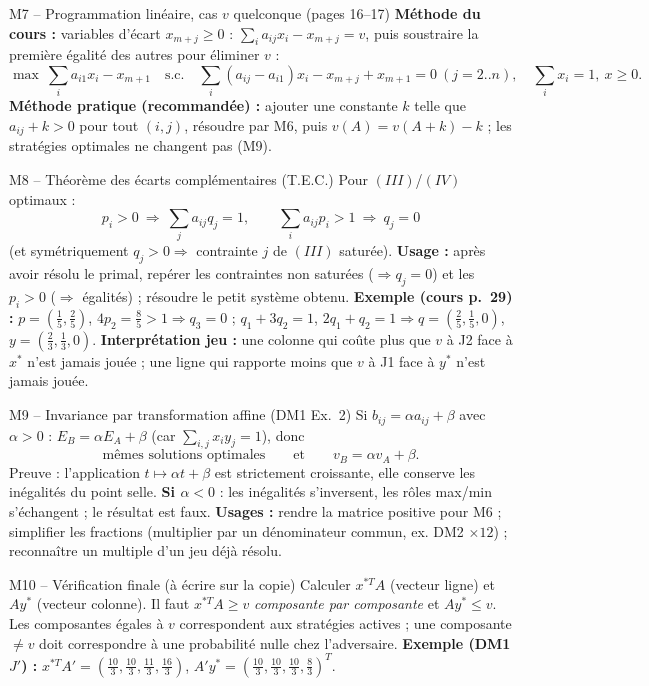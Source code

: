 \documentclass[11pt,a4paper]{article}
\begin{document}
\begin{methbox}{M7 -- Programmation linéaire, cas $v$ quelconque (pages 16--17)}
\textbf{Méthode du cours :} variables d'écart $x_{m+j}\ge0$ : $\sum_ia_{ij}x_i-x_{m+j}=v$, puis soustraire la première égalité des autres pour éliminer $v$ :
\[
\max\ \sum_i a_{i1}x_i-x_{m+1}\quad\text{s.c.}\quad \sum_i(a_{ij}-a_{i1})x_i-x_{m+j}+x_{m+1}=0\ (j=2..n),\quad \sum_ix_i=1,\ x\ge0.
\]
\textbf{Méthode pratique (recommandée) :} ajouter une constante $k$ telle que $a_{ij}+k>0$ pour tout $(i,j)$, résoudre par M6, puis $v(A)=v(A+k)-k$ ; les stratégies optimales ne changent pas (M9).
\end{methbox}

\begin{methbox}{M8 -- Théorème des écarts complémentaires (T.E.C.)}
Pour $(III)$/$(IV)$ optimaux :
\[
p_i>0\ \Rightarrow\ \sum_j a_{ij}q_j=1,\qquad \sum_i a_{ij}p_i>1\ \Rightarrow\ q_j=0
\]
(et symétriquement $q_j>0\Rightarrow$ contrainte $j$ de $(III)$ saturée). \textbf{Usage :} après avoir résolu le primal, repérer les contraintes non saturées ($\Rightarrow q_j=0$) et les $p_i>0$ ($\Rightarrow$ égalités) ; résoudre le petit système obtenu.
\textbf{Exemple (cours p.~29) :} $p=(\frac15,\frac25)$, $4p_2=\frac85>1\Rightarrow q_3=0$ ; $q_1+3q_2=1$, $2q_1+q_2=1\Rightarrow q=(\frac25,\frac15,0)$, $y=(\frac23,\frac13,0)$.
\textbf{Interprétation jeu :} une colonne qui coûte plus que $v$ à J2 face à $x^*$ n'est jamais jouée ; une ligne qui rapporte moins que $v$ à J1 face à $y^*$ n'est jamais jouée.
\end{methbox}

\begin{methbox}{M9 -- Invariance par transformation affine (DM1 Ex.~2)}
Si $b_{ij}=\alpha a_{ij}+\beta$ avec $\alpha>0$ : $E_B=\alpha E_A+\beta$ (car $\sum_{i,j}x_iy_j=1$), donc
\[
\text{mêmes solutions optimales}\qquad\text{et}\qquad v_B=\alpha v_A+\beta.
\]
Preuve : l'application $t\mapsto\alpha t+\beta$ est strictement croissante, elle conserve les inégalités du point selle. \textbf{Si $\alpha<0$} : les inégalités s'inversent, les rôles max/min s'échangent ; le résultat est faux.
\textbf{Usages :} rendre la matrice positive pour M6 ; simplifier les fractions (multiplier par un dénominateur commun, ex. DM2 $\times12$) ; reconnaître un multiple d'un jeu déjà résolu.
\end{methbox}

\begin{methbox}{M10 -- Vérification finale (à écrire sur la copie)}
Calculer $x^{*T}A$ (vecteur ligne) et $Ay^*$ (vecteur colonne). Il faut $x^{*T}A\ge v$ \emph{composante par composante} et $Ay^*\le v$. Les composantes égales à $v$ correspondent aux stratégies actives ; une composante $\ne v$ doit correspondre à une probabilité nulle chez l'adversaire.
\textbf{Exemple (DM1 $J'$) :} $x^{*T}A'=(\frac{10}3,\frac{10}3,\frac{11}3,\frac{16}3)$, $A'y^*=(\frac{10}3,\frac{10}3,\frac{10}3,\frac83)^T$.
\end{methbox}
\end{document}
